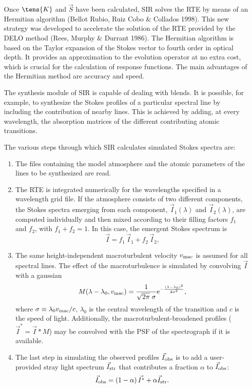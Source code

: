 Once $\tens{K}$ and $\vec{S}$ have been calculated, SIR solves the RTE
by means of an Hermitian algorithm (Bellot Rubio, Ruiz Cobo \& Collados
1998).  This new strategy was developed to accelerate the solution of
the RTE provided by the DELO method (Rees, Murphy \& Durrant 1986). The
Hermitian algorithm is based on the Taylor expansion of the Stokes vector
to fourth order in optical depth. It provides an approximation to the
evolution operator at no extra cost, which is crucial for the calculation
of response functions. The main advantages of the Hermitian method
are accuracy and speed. 

The synthesis module of SIR is capable of dealing with blends. It is
possible, for example, to synthesize the Stokes profiles of a
particular spectral line by including the contribution of nearby
lines.  This is achieved by adding, at every wavelength, the absorption
matrices of the different contributing atomic transitions. 

The various steps through which SIR calculates simulated Stokes spectra 
are:

\begin{enumerate}
\item The files containing the model atmosphere and the atomic parameters 
of the lines to be synthesized are read. 
\item The RTE is integrated numerically for the wavelengths specified
in a wavelength grid file. If the atmosphere consists of two
different components, the Stokes spectra emerging from each component,
$\vec{I}_1(\lambda)$ and $\vec{I}_2(\lambda)$, are computed
individually and then mixed according to their filling factors
$f_1$ and $f_2$, with $f_1 + f_2=1$. In this case, the emergent Stokes 
spectrum is
\begin{displaymath}
\vec{I} = f_1 \, \vec{I}_1 + f_2 \, \vec{I}_2,
\end{displaymath}
\item The same height-independent macroturbulent velocity $v_{\rm mac}$ 
is assumed for all spectral lines. The effect of the macroturbulence is 
simulated by convolving $\vec{I}$ with a gaussian 
\begin{displaymath}
M(\lambda - \lambda_0, v_{\rm mac}) = \frac{1}{\sqrt{2\pi} \; \sigma} 
{\rm e}^{{-\frac{(\lambda-\lambda_0)^2}{2\sigma^2}}},
\end{displaymath}
where $\sigma \equiv \lambda_0 v_{\rm mac}/c$, $\lambda_0$ is the central
wavelength of the transition and $c$ is the speed of light. Additionally, 
the macroturbulent-broadened profiles ($\vec{I}^* = \vec{I}*M$) may be 
convolved with the PSF of the spectrograph if it is available. 
\item The last step in simulating the observed profiles $\vec{I}_{\rm obs}$ 
is to add a user-provided stray light spectrum $\vec{I}_{\rm str}$ that 
contributes a fraction $\alpha$ to $\vec{I}_{\rm obs}$:
\begin{displaymath}
\vec{I}_{\rm obs} = (1-\alpha) \, \vec{I^*} + \alpha \vec{I}_{\rm str}.
\end{displaymath}
\end{enumerate}

